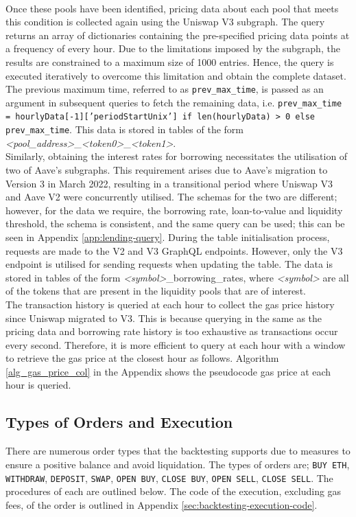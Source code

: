 \\[3mm]
Once these pools have been identified, pricing data about each pool that meets this condition is collected again using the Uniswap V3 subgraph. The query returns an array of dictionaries containing the pre-specified pricing data points at a frequency of every hour. Due to the limitations imposed by the subgraph, the results are constrained to a maximum size of 1000 entries. Hence, the query is executed iteratively to overcome this limitation and obtain the complete dataset. The previous maximum time, referred to as \texttt{prev\_max\_time}, is passed as an argument in subsequent queries to fetch the remaining data, i.e. \texttt{prev\_max\_time = hourlyData[-1]['periodStartUnix'] if len(hourlyData) > 0 else prev\_max\_time}. This data is stored in tables of the form \textit{<pool\_address>}\_\textit{<token0>}\_\textit{<token1>}.
\\[3mm]
Similarly, obtaining the interest rates for borrowing necessitates the utilisation of two of Aave's subgraphs. This requirement arises due to Aave's migration to Version 3 in March 2022, resulting in a transitional period where Uniswap V3 and Aave V2 were concurrently utilised. The schemas for the two are different; however, for the data we require, the borrowing rate, loan-to-value and liquidity threshold, the schema is consistent, and the same query can be used; this can be seen in Appendix \ref{app:lending-query}. During the table initialisation process, requests are made to the V2 and V3 GraphQL endpoints. However, only the V3 endpoint is utilised for sending requests when updating the table. The data is stored in tables of the form \textit{<symbol>}\_borrowing\_rates, where \textit{<symbol>} are all of the tokens that are present in the liquidity pools that are of interest.
\\[3mm]
The transaction history is queried at each hour to collect the gas price history since Uniswap migrated to V3. This is because querying in the same as the pricing data and borrowing rate history is too exhaustive as transactions occur every second. Therefore, it is more efficient to query at each hour with a window to retrieve the gas price at the closest hour as follows. Algorithm \ref{alg_gas_price_col} in the Appendix shows the pseudocode gas price at each hour is queried. 
\subsection{Types of Orders and Execution}
There are numerous order types that the backtesting supports due to measures to ensure a positive balance and avoid liquidation. The types of orders are; \texttt{BUY\ ETH}, \texttt{WITHDRAW}, \texttt{DEPOSIT}, \texttt{SWAP}, \texttt{OPEN\ BUY}, \texttt{CLOSE\ BUY}, \texttt{OPEN\ SELL}, \texttt{CLOSE\ SELL}. The procedures of each are outlined below. The code of the execution, excluding gas fees, of the order is outlined in Appendix \ref{sec:backtesting-execution-code}.

